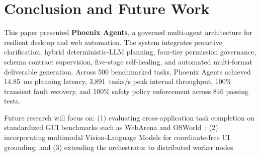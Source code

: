 \documentclass[conference]{IEEEtran}
\begin{document}
\section{Conclusion and Future Work}

This paper presented \textbf{Phoenix Agents}, a governed multi-agent architecture for resilient desktop and web automation. The system integrates proactive clarification, hybrid deterministic-LLM planning, four-tier permission governance, schema contract supervision, five-stage self-healing, and automated multi-format deliverable generation. Across 500 benchmarked tasks, Phoenix Agents achieved 14.85~ms planning latency, 3,891~tasks/s peak internal throughput, 100\% transient fault recovery, and 100\% safety policy enforcement across 846 passing tests.

Future research will focus on: (1) evaluating cross-application task completion on standardized GUI benchmarks such as WebArena and OSWorld~\cite{zhou2023,nguyen2025,koh2024}; (2) incorporating multimodal Vision-Language Models for coordinate-free UI grounding; and (3) extending the orchestrator to distributed worker nodes.
\end{document}
